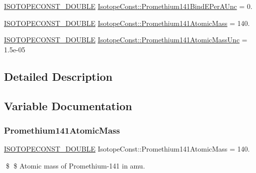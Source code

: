 \begin{DoxyCompactItemize}
\item 
\mbox{\hyperlink{group___isotope_const-_macros_ga8f45a7272ce02c0b4c65c44636ed719a}{I\+S\+O\+T\+O\+P\+E\+C\+O\+N\+S\+T\+\_\+\+D\+O\+U\+B\+LE}} \mbox{\hyperlink{group___isotope_const-_promethium-_pm141_ga05e8ccea3a2aece07d737cefdc829f41}{Isotope\+Const\+::\+Promethium141\+Bind\+E\+Per\+A\+Unc}} = 0.
\item 
\mbox{\hyperlink{group___isotope_const-_macros_ga8f45a7272ce02c0b4c65c44636ed719a}{I\+S\+O\+T\+O\+P\+E\+C\+O\+N\+S\+T\+\_\+\+D\+O\+U\+B\+LE}} \mbox{\hyperlink{group___isotope_const-_promethium-_pm141_gaa4bc6c576fd07e4beec5e23b388494ab}{Isotope\+Const\+::\+Promethium141\+Atomic\+Mass}} = 140.
\item 
\mbox{\hyperlink{group___isotope_const-_macros_ga8f45a7272ce02c0b4c65c44636ed719a}{I\+S\+O\+T\+O\+P\+E\+C\+O\+N\+S\+T\+\_\+\+D\+O\+U\+B\+LE}} \mbox{\hyperlink{group___isotope_const-_promethium-_pm141_ga9436727afb8d5edc0bc83595295facb6}{Isotope\+Const\+::\+Promethium141\+Atomic\+Mass\+Unc}} = 1.\+5e-\/05
\end{DoxyCompactItemize}


\subsection{Detailed Description}


\subsection{Variable Documentation}
\mbox{\label{group___isotope_const-_promethium-_pm141_gaa4bc6c576fd07e4beec5e23b388494ab}} 
\subsubsection{\texorpdfstring{Promethium141\+Atomic\+Mass}{Promethium141AtomicMass}}
{\footnotesize\ttfamily \mbox{\hyperlink{group___isotope_const-_macros_ga8f45a7272ce02c0b4c65c44636ed719a}{I\+S\+O\+T\+O\+P\+E\+C\+O\+N\+S\+T\+\_\+\+D\+O\+U\+B\+LE}} Isotope\+Const\+::\+Promethium141\+Atomic\+Mass = 140.}

\$ \$ Atomic mass of Promethium-\/141 in amu. \mbox{\label{group___isotope_const-_promethium-_pm141_ga9436727afb8d5edc0bc83595295facb6}} 
